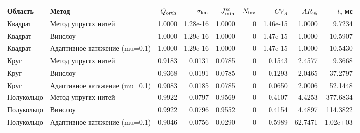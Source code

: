 \begin{tabular}{llrrrrrrr}
\toprule
Область & Метод & $Q_{\rm orth}$ & $\sigma_{\rm len}$ & $J_{\min}^{\rm sc}$ & $N_{\rm inv}$ & $CV_A$ & $AR_{95}$ & $t$, мс \\
\midrule
Квадрат & Метод упругих нитей & 1.0000 & 1.28e-16 & 1.0000 & 0 & 1.46e-15 & 1.0000 & 9.7234 \\
Квадрат & Винслоу & 1.0000 & 1.29e-16 & 1.0000 & 0 & 1.47e-15 & 1.0000 & 10.5907 \\
Квадрат & Адаптивное натяжение (mu=0.1) & 1.0000 & 1.29e-16 & 1.0000 & 0 & 1.47e-15 & 1.0000 & 10.5430 \\
Круг & Метод упругих нитей & 0.9183 & 0.0131 & 0.0785 & 0 & 0.1543 & 2.4577 & 9.3668 \\
Круг & Винслоу & 0.9368 & 0.0191 & 0.0785 & 0 & 0.1293 & 2.0465 & 37.2797 \\
Круг & Адаптивное натяжение (mu=0.1) & 0.9083 & 0.0185 & 0.0785 & 0 & 0.0650 & 2.0006 & 52.1448 \\
Полукольцо & Метод упругих нитей & 0.9922 & 0.0797 & 0.9569 & 0 & 0.4107 & 4.4253 & 377.6834 \\
Полукольцо & Винслоу & 0.9922 & 0.0796 & 0.9552 & 0 & 0.4154 & 4.4897 & 114.3822 \\
Полукольцо & Адаптивное натяжение (mu=0.1) & 0.9046 & 0.0756 & 0.0290 & 0 & 0.5989 & 62.7471 & 1.02e+03 \\
\bottomrule
\end{tabular}
